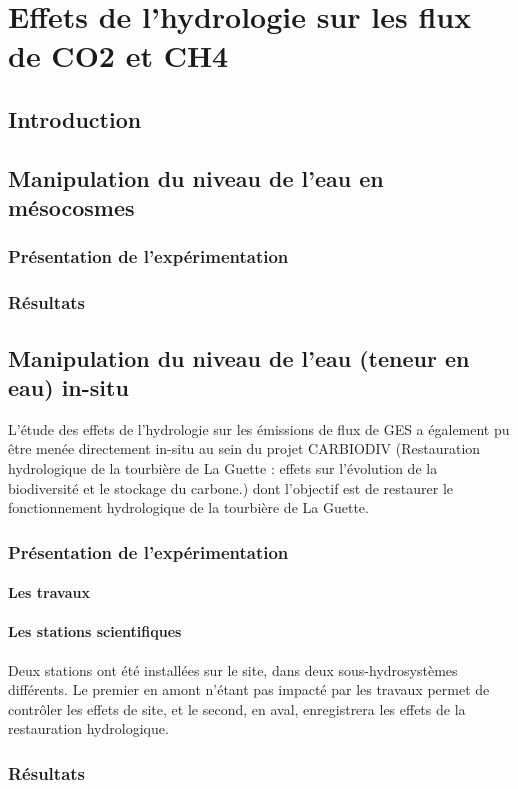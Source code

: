 \chapter{Effets de l'hydrologie sur les flux de CO2 et CH4}
\newpage

\section{Introduction}
\section{Manipulation du niveau de l'eau en mésocosmes}
\subsection{Présentation de l'expérimentation}
\subsection{Résultats}

\section{Manipulation du niveau de l'eau (teneur en eau) in-situ}
L'étude des effets de l'hydrologie sur les émissions de flux de GES a également pu être menée directement in-situ au sein du projet CARBIODIV (Restauration hydrologique de la tourbière de La Guette : effets sur l'évolution de la biodiversité et le stockage du carbone.) dont l'objectif est de restaurer le fonctionnement hydrologique de la tourbière de La Guette.
\subsection{Présentation de l'expérimentation}
\subsubsection{Les travaux}
\subsubsection{Les stations scientifiques}
Deux stations ont été installées sur le site, dans deux sous-hydrosystèmes différents. Le premier en amont n'étant pas impacté par les travaux permet de contrôler les effets de site, et le second, en aval, enregistrera les effets de la restauration hydrologique.
\subsection{Résultats}
